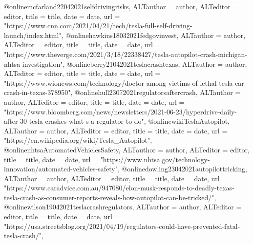 {{{@online{mcfarland22042021selfdrivingrisks,	ALTauthor = {author},	ALTeditor = {editor},	title = {title},	date = {date},	url = {"https://www.cnn.com/2021/04/21/tech/tesla-full-self-driving-launch/index.html"},}
@online{hawkins18032021fedgovinvest,	ALTauthor = {author},	ALTeditor = {editor},	title = {title},	date = {date},	url = {"https://www.theverge.com/2021/3/18/22338427/tesla-autopilot-crash-michigan-nhtsa-investigation"},}
@online{berry21042021teslacrashtexas,	ALTauthor = {author},	ALTeditor = {editor},	title = {title},	date = {date},	url = {"https://www.wionews.com/technology/doctor-among-victims-of-lethal-tesla-car-crash-in-texas-378950"},}
@online{hull23072021regulatorsaftercrash,	ALTauthor = {author},	ALTeditor = {editor},	title = {title},	date = {date},	url = {"https://www.bloomberg.com/news/newsletters/2021-06-23/hyperdrive-daily-after-30-tesla-crashes-what-s-a-regulator-to-do"},}
@online{wikiTeslaAutopilot,	ALTauthor = {author},	ALTeditor = {editor},	title = {title},	date = {date},	url = {"https://en.wikipedia.org/wiki/Tesla_Autopilot"},}
@online{nhtsaAutomatedVehiclesSafety,	ALTauthor = {author},	ALTeditor = {editor},	title = {title},	date = {date},	url = {"https://www.nhtsa.gov/technology-innovation/automated-vehicles-safety"},}
@online{dowling23042021autopilottricking,	ALTauthor = {author},	ALTeditor = {editor},	title = {title},	date = {date},	url = {"https://www.caradvice.com.au/947080/elon-musk-responds-to-deadly-texas-tesla-crash-as-consumer-reports-reveals-how-autopilot-can-be-tricked/"},}
@online{wilson19042021teslacrashregulators,	ALTauthor = {author},	ALTeditor = {editor},	title = {title},	date = {date},	url = {"https://usa.streetsblog.org/2021/04/19/regulators-could-have-prevented-fatal-tesla-crash/"},}

}}}
